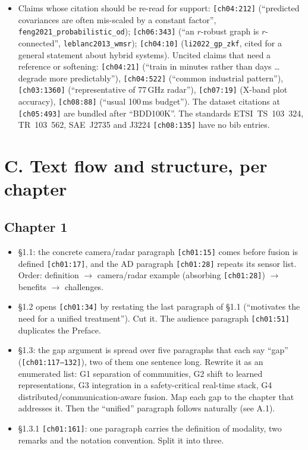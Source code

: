 \documentclass[10pt,a4paper]{article}
\newcommand{\src}[1]{{\footnotesize\texttt{[#1]}}}
\newcommand{\key}[1]{\texttt{#1}}
\begin{document}
\begin{itemize}
\item Claims whose citation should be re-read for support: \src{ch04:212} (``predicted covariances are often mis-scaled by a constant factor'', \key{feng2021\_probabilistic\_od}); \src{ch06:343} (``an $r$-robust graph is $r$-connected'', \key{leblanc2013\_wmsr}); \src{ch04:10} (\key{li2022\_gp\_zkf}, cited for a general statement about hybrid systems). Uncited claims that need a reference or softening: \src{ch04:21} (``train in minutes rather than days \ldots{} degrade more predictably''), \src{ch04:522} (``common industrial pattern''), \src{ch03:1360} (``representative of 77\,GHz radar''), \src{ch07:19} (X-band plot accuracy), \src{ch08:88} (``usual 100\,ms budget''). The dataset citations at \src{ch05:493} are bundled after ``BDD100K''. The standards ETSI~TS~103~324, TR~103~562, SAE~J2735 and J3224 \src{ch08:135} have no bib entries.
\end{itemize}

\section*{C. Text flow and structure, per chapter}

\subsection*{Chapter 1}
\begin{itemize}
\item \S1.1: the concrete camera/radar paragraph \src{ch01:15} comes before fusion is defined \src{ch01:17}, and the AD paragraph \src{ch01:28} repeats its sensor list. Order: definition $\to$ camera/radar example (absorbing \src{ch01:28}) $\to$ benefits $\to$ challenges.
\item \S1.2 opens \src{ch01:34} by restating the last paragraph of \S1.1 (``motivates the need for a unified treatment''). Cut it. The audience paragraph \src{ch01:51} duplicates the Preface.
\item \S1.3: the gap argument is spread over five paragraphs that each say ``gap'' (\src{ch01:117--132}), two of them one sentence long. Rewrite it as an enumerated list: G1 separation of communities, G2 shift to learned representations, G3 integration in a safety-critical real-time stack, G4 distributed/communication-aware fusion. Map each gap to the chapter that addresses it. Then the ``unified'' paragraph follows naturally (see A.1).
\item \S1.3.1 \src{ch01:161}: one paragraph carries the definition of modality, two remarks and the notation convention. Split it into three.
\end{itemize}
\end{document}
